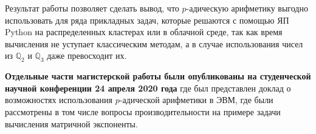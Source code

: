 \documentclass[master, och, autoref, times]{sty/SCWorks}
\theoremstyle{plain}
\theoremstyle{definition}
\numberwithin{equation}{section}
\begin{document}
Результат работы позволяет сделать вывод, что $p$-адическую \mbox{арифметику} выгодно использовать для ряда прикладных задач, которые решаются с помощью ЯП Python на распределенных кластерах или в облачной среде, так как время вычисления не уступает классическим методам, а в случае использования чисел из $\mathbb{Q}_2$ и $\mathbb{Q}_3$ даже превосходит их.


\textbf{Отдельные части магистерской работы были опубликованы на студенческой научной конференции 24 апреля 2020 года} где был представлен доклад о возможностях использования $p$-адической арифметики в ЭВМ, где были рассмотрены в том числе вопросы производительности на примере задачи вычисления матричной экспоненты.

\nocite{*}


\end{document}
